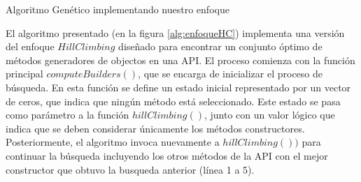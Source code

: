 
\begin{algorithm}[H]
    \caption{Algoritmo Genético implementando nuestro enfoque}
    \label{alg:enfoqueHC}

    \BlankLine

    \BlankLine

    \BlankLine



\end{algorithm}



El algoritmo presentado (en la figura \ref{alg:enfoqueHC}) implementa una versión del enfoque $Hill Climbing$ 
diseñado para encontrar un conjunto óptimo de métodos generadores de objectos en una API. 
El proceso comienza con la función principal $computeBuilders()$, que se encarga de inicializar el proceso de búsqueda. 
En esta función se define un estado inicial representado por un vector de ceros, 
que indica que ningún método está seleccionado. Este estado se pasa como parámetro a la función $hillClimbing()$, 
junto con un valor lógico que indica que se deben considerar únicamente los métodos constructores. 
Posteriormente, el algoritmo invoca nuevamente a $hillClimbing())$ para continuar la búsqueda incluyendo los otros métodos de la API con el mejor constructor que obtuvo
la busqueda anterior (línea 1 a 5).

